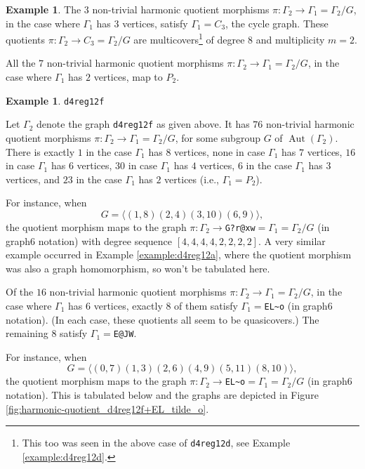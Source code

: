\documentclass[12pt,letterpaper]{article}
\theoremstyle{definition}
\newtheorem{example}[theorem]{Example}
\DeclareMathOperator{\Aut}{Aut}
\begin{document}
\begin{example}
{The $3$ non-trivial harmonic quotient morphisms
$\pi: \Gamma_2\to \Gamma_1=\Gamma_2/G$, in the case where
$\Gamma_1$ has $3$ vertices,
satisfy $\Gamma_1=C_3$, the cycle graph.
These quotients $\pi: \Gamma_2\to C_3=\Gamma_2/G$
are multicovers\footnote{This too was seen in the above case of
{\tt d4reg12d}, see Example \ref{example:d4reg12d}.}
of degree $8$ and multiplicity $m=2$.

All the $7$ non-trivial harmonic quotient morphisms
$\pi: \Gamma_2\to \Gamma_1=\Gamma_2/G$, in the case where
$\Gamma_1$ has $2$ vertices, map to $P_2$.
}
\end{example}



\begin{example}%
\label{example:d4reg12f}
 {\tt d4reg12f}\newline
{\rm  
  Let $\Gamma_2$ denote the graph {\tt d4reg12f} as given above.
It has $76$  non-trivial harmonic quotient morphisms
$\pi: \Gamma_2\to \Gamma_1=\Gamma_2/G$,
for some subgroup $G$ of $\Aut(\Gamma_2)$.
There is exactly $1$ in the case $\Gamma_1$ has $8$ vertices,
none in case $\Gamma_1$ has $7$ vertices,
$16$ in case $\Gamma_1$ has $6$ vertices,
$30$ in case $\Gamma_1$ has $4$ vertices,
$6$ in the case $\Gamma_1$ has $3$ vertices,
and $23$ in the case $\Gamma_1$ has $2$ vertices
(i.e., $\Gamma_1=P_2$).

For instance, when
\[
G = \langle (1,8)(2,4)(3,10)(6,9)  \rangle ,
\]
the quotient morphism maps to the graph
$\pi: \Gamma_2\to $\verb+G?r@xw+$=\Gamma_1=\Gamma_2/G $ (in graph6 notation)
with degree sequence $[4,4,4,4,2,2,2,2]$. A very similar example occurred in
Example \ref{example:d4reg12a}, where the quotient morphism
was also a graph homomorphism, so won't be tabulated here.

Of the $16$ non-trivial harmonic quotient morphisms
$\pi: \Gamma_2\to \Gamma_1=\Gamma_2/G$, in the case where
$\Gamma_1$ has $6$ vertices, exactly $8$ of them
satisfy $\Gamma_1=$\verb+EL~o+ (in graph6 notation).
(In each case, these quotients all seem to be quasicovers.)
The remaining $8$ satisfy $\Gamma_1=$\verb+E@JW+.

For instance, when
\[
G = \langle (0,7)(1,3)(2,6)(4,9)(5,11)(8,10) \rangle ,
\]
the quotient morphism maps to the graph
$\pi: \Gamma_2\to $\verb+EL~o+$=\Gamma_1=\Gamma_2/G $ (in graph6 notation).
This is tabulated below and the graphs are depicted in
Figure \ref{fig:harmonic-quotient_d4reg12f+EL_tilde_o}.

}
\end{example}
\end{document}
